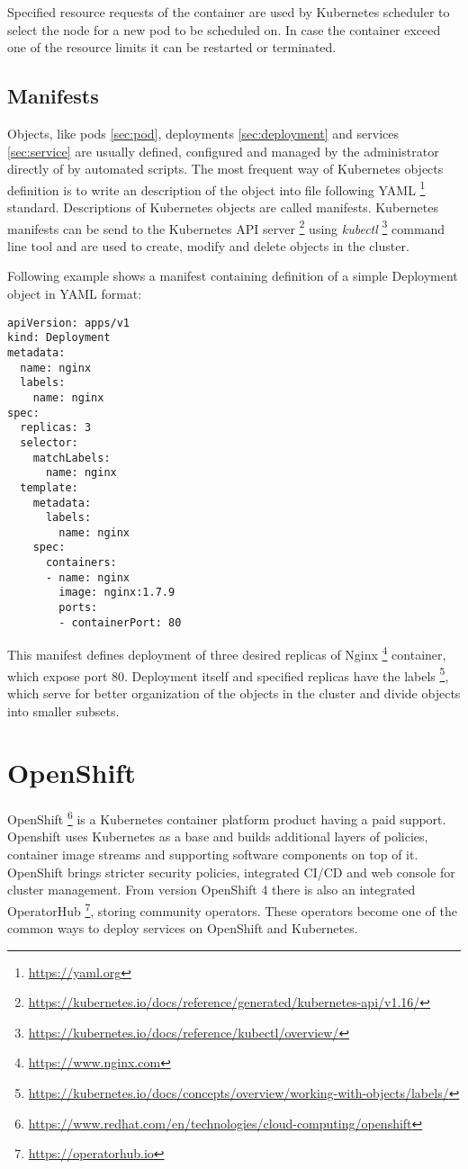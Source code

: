 \documentclass[
  digital, %
  twoside, %
  table,   %
  lof,     %
  lot,     %
]{fithesis3}
\begin{document}
Specified resource requests of the container are used by Kubernetes scheduler to select the node for a new pod to be scheduled on. In case the container exceed one of the resource limits it can be restarted or terminated.

\subsection{Manifests} \label{sec:manifest}
Objects, like pods \ref{sec:pod}, deployments \ref{sec:deployment} and services \ref{sec:service} are usually defined, configured and managed by the administrator directly of by automated scripts. The most frequent way of Kubernetes objects definition is to write an description of the object into file following YAML \footnote{\url{https://yaml.org}} standard. Descriptions of Kubernetes objects are called manifests. Kubernetes manifests can be send to the Kubernetes API server \footnote{\url{https://kubernetes.io/docs/reference/generated/kubernetes-api/v1.16/}} using \textit{kubectl} \footnote{\url{https://kubernetes.io/docs/reference/kubectl/overview/}} command line tool and are used to create, modify and delete objects in the cluster.

Following example shows a manifest containing definition of a simple Deployment object in YAML format:
\begin{lstlisting}
apiVersion: apps/v1
kind: Deployment
metadata:
  name: nginx
  labels:
    name: nginx
spec:
  replicas: 3
  selector:
    matchLabels:
      name: nginx
  template:
    metadata:
      labels:
        name: nginx
    spec:
      containers:
      - name: nginx
        image: nginx:1.7.9
        ports:
        - containerPort: 80
\end{lstlisting}
This manifest defines deployment of three desired replicas of Nginx \footnote{\url{https://www.nginx.com}} container, which expose port 80. Deployment itself and specified replicas have the labels \footnote{\url{https://kubernetes.io/docs/concepts/overview/working-with-objects/labels/}}, which serve for better organization of the objects in the cluster and divide objects into smaller subsets.

\section{OpenShift} \label{sec:openshift}
OpenShift \footnote{\url{https://www.redhat.com/en/technologies/cloud-computing/openshift}} is a Kubernetes container platform product having a paid support. Openshift uses Kubernetes as a base and builds additional layers of policies, container image streams and supporting software components on top of it. OpenShift brings stricter security policies, integrated CI/CD and web console for cluster management. From version OpenShift 4 there is also an integrated OperatorHub \footnote{\url{https://operatorhub.io}}, storing community operators. These operators become one of the common ways to deploy services on OpenShift and Kubernetes.
\end{document}

